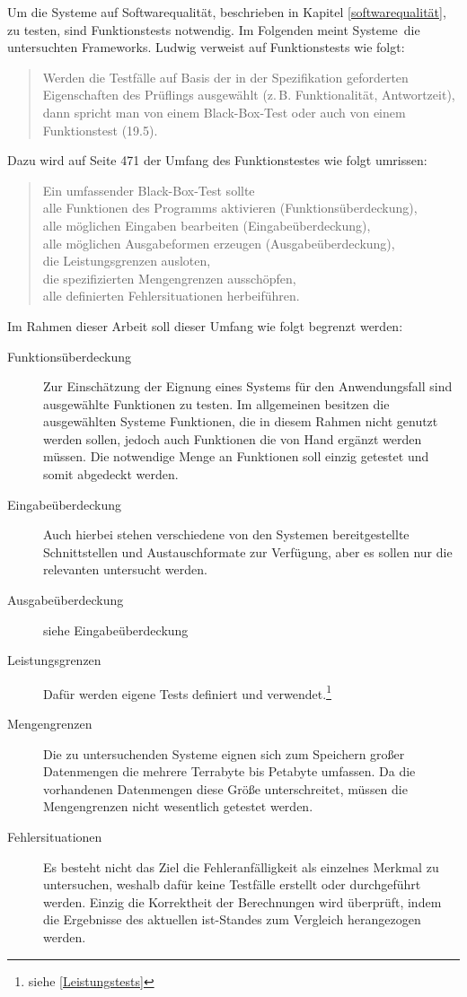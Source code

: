 \label{grundlagen-funktionstests}
Um die Systeme auf Softwarequalität, beschrieben in Kapitel \ref{softwarequalität}, zu testen, sind Funktionstests notwendig.
Im Folgenden meint \glqq Systeme\grqq\ die untersuchten Frameworks.
Ludwig verweist auf Funktionstests wie folgt:
\begin{quote}
Werden die Testfälle auf Basis der in der Spezifikation geforderten Eigenschaften des Prüflings ausgewählt (z.\,B. Funktionalität, Antwortzeit), dann spricht man von einem Black-Box-Test oder auch von einem Funktionstest (19.5). \cite[S.455]{book:softwareengineering}
\end{quote}
Dazu wird auf Seite 471 der Umfang des Funktionstestes wie folgt umrissen:
\begin{quote}
Ein umfassender Black-Box-Test sollte\\
alle Funktionen des Programms aktivieren (Funktionsüberdeckung),\\
alle möglichen Eingaben bearbeiten (Eingabeüberdeckung),\\
alle möglichen Ausgabeformen erzeugen (Ausgabeüberdeckung),\\
die Leistungsgrenzen ausloten,\\
die spezifizierten Mengengrenzen ausschöpfen,\\
alle definierten Fehlersituationen herbeiführen.
\end{quote}
Im Rahmen dieser Arbeit soll dieser Umfang wie folgt begrenzt werden:
\begin{description}
\item[Funktionsüberdeckung] Zur Einschätzung der Eignung eines Systems für den Anwendungsfall sind ausgewählte Funktionen zu testen. Im allgemeinen besitzen die ausgewählten Systeme Funktionen, die in diesem Rahmen nicht genutzt werden sollen, jedoch auch Funktionen die von Hand ergänzt werden müssen. Die notwendige Menge an Funktionen soll einzig getestet und somit abgedeckt werden.
\item[Eingabeüberdeckung] Auch hierbei stehen verschiedene von den Systemen bereitgestellte Schnittstellen und Austauschformate zur Verfügung, aber es sollen nur die relevanten untersucht werden.
\item[Ausgabeüberdeckung] siehe Eingabeüberdeckung
\item[Leistungsgrenzen] Dafür werden eigene Tests definiert und verwendet.\footnote{siehe \ref{Leistungstests}}
\item[Mengengrenzen] Die zu untersuchenden Systeme eignen sich zum Speichern großer Datenmengen die mehrere Terrabyte bis Petabyte umfassen. Da die vorhandenen Datenmengen diese Größe unterschreitet, müssen die Mengengrenzen nicht wesentlich getestet werden.
\item[Fehlersituationen] Es besteht nicht das Ziel die Fehleranfälligkeit als einzelnes Merkmal zu untersuchen, weshalb dafür keine Testfälle erstellt oder durchgeführt werden. Einzig die Korrektheit der Berechnungen wird überprüft, indem die Ergebnisse des aktuellen ist-Standes zum Vergleich herangezogen werden. 
\end{description}

